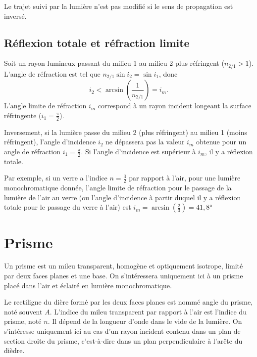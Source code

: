 \begin{theo}
  Le trajet suivi par la lumière n'est pas modifié si le sens de propagation est inversé.
\end{theo}

\subsection{Réflexion totale et réfraction limite}
\label{chap6-subsec:reftotale}
Soit un rayon lumineux passant du milieu 1 au milieu 2 plus réfringent ($n_{2/1}>1$). L'angle de réfraction est tel que $n_{2/1} \sin i_2 = \sin i_1$, donc
\begin{equation}
  i_2 < \arcsin \left(\frac{1}{n_{2/1}} \right) = i_m.
\end{equation}
L'angle limite de réfraction $i_m$ correspond à un rayon incident longeant la surface réfringente ($i_1 = \frac{\pi}{2}$).

Inversement, si la lumière passe du milieu 2 (plus réfringent) au milieu 1 (moins réfringent), l'angle d'incidence $i_2$ ne dépassera pas la valeur $i_m$ obtenue pour un angle de réfraction $i_1 = \frac{\pi}{2}$. Si l'angle d'incidence est supérieur à $i_m$, il y a réflexion totale.

Par exemple, si un verre a l'indice $n=\frac{3}{2}$ par rapport à l'air, pour une lumière monochromatique donnée, l'angle limite de réfraction pour le passage de la lumière de l'air au verre (ou l'angle d'incidence à partir duquel il y a réflexion totale pour le passage du verre à l'air) est $i_m = \arcsin\left(\frac{2}{3}\right) = 41,8°$

\section{Prisme}
\label{chap6-sec:prisme}

Un prisme est un mileu transparent, homogène et optiquement isotrope, limité par deux faces planes et une base. On s'intéressera uniquement ici à un prisme placé dans l'air et éclairé en lumière monochromatique.

Le rectiligne du dière formé par les deux faces planes est nommé angle du prisme, noté souvent $A$. L'indice du mileu transparent par rapport à l'air est l'indice du prisme, noté $n$. Il dépend de la longueur d'onde dans le vide de la lumière. On s'intéresse uniquement ici au cas d'un rayon incident contenu dans un plan de section droite du prisme, c'est-à-dire dans un plan perpendiculaire à l'arête du dièdre.

